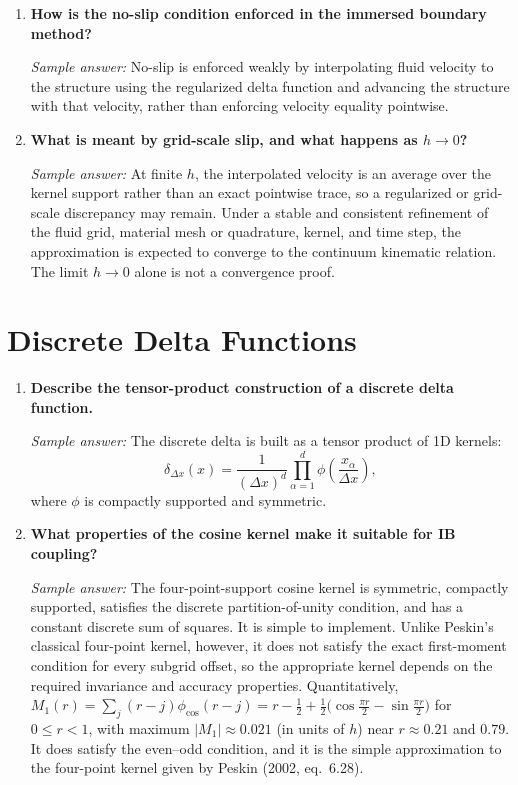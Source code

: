 \documentclass[11pt]{article}
\begin{document}
\begin{enumerate}[label=\arabic*., resume]

\item \textbf{How is the no-slip condition enforced in the immersed boundary method?}

\textit{Sample answer:}  
No-slip is enforced weakly by interpolating fluid velocity to the structure using the regularized delta function and advancing the structure with that velocity, rather than enforcing velocity equality pointwise.

\item \textbf{What is meant by grid-scale slip, and what happens as $h \to 0$?}

\textit{Sample answer:}  
At finite $h$, the interpolated velocity is an average over the kernel support rather than an exact pointwise trace, so a regularized or grid-scale discrepancy may remain. Under a stable and consistent refinement of the fluid grid, material mesh or quadrature, kernel, and time step, the approximation is expected to converge to the continuum kinematic relation. The limit $h\to0$ alone is not a convergence proof.

\end{enumerate}

\section*{Discrete Delta Functions}

\begin{enumerate}[label=\arabic*., resume]

\item \textbf{Describe the tensor-product construction of a discrete delta function.}

\textit{Sample answer:}  
The discrete delta is built as a tensor product of 1D kernels:
\[
\delta_{\Delta x}(x) = \frac{1}{(\Delta x)^d}\prod_{\alpha=1}^d \phi\left(\frac{x_\alpha}{\Delta x}\right),
\]
where $\phi$ is compactly supported and symmetric.

\item \textbf{What properties of the cosine kernel make it suitable for IB coupling?}

\textit{Sample answer:}  
The four-point-support cosine kernel is symmetric, compactly supported, satisfies the discrete partition-of-unity condition, and has a constant discrete sum of squares. It is simple to implement. Unlike Peskin's classical four-point kernel, however, it does not satisfy the exact first-moment condition for every subgrid offset, so the appropriate kernel depends on the required invariance and accuracy properties. Quantitatively, $M_1(r)=\sum_j(r-j)\phi_{\cos}(r-j)=r-\tfrac12+\tfrac12\bigl(\cos\tfrac{\pi r}{2}-\sin\tfrac{\pi r}{2}\bigr)$ for $0\le r<1$, with maximum $|M_1|\approx0.021$ (in units of $h$) near $r\approx0.21$ and $0.79$. It does satisfy the even--odd condition, and it is the simple approximation to the four-point kernel given by Peskin (2002, eq.~6.28).

\end{enumerate}
\end{document}
